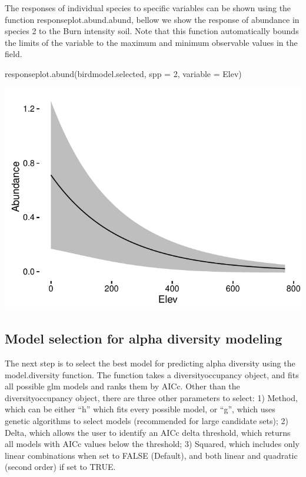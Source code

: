 \documentclass[article]{jss}
\begin{document}
The responses of individual species to specific variables can be shown
using the function responseplot.abund.abund, bellow we show the response
of abundance in species 2 to the Burn intensity soil. Note that this
function automatically bounds the limits of the variable to the maximum
and minimum observable values in the field.

\begin{CodeChunk}
\begin{CodeInput}
responseplot.abund(birdmodel.selected, spp = 2, variable = Elev)
\end{CodeInput}


\begin{center}\includegraphics{diversityocc_files/figure-latex/unnamed-chunk-16-1} \end{center}

\end{CodeChunk}

\subsection{Model selection for alpha diversity
modeling}\label{model-selection-for-alpha-diversity-modeling}

The next step is to select the best model for predicting alpha diversity
using the model.diversity function. The function takes a
diversityoccupancy object, and fits all possible glm models and ranks
them by AICc. Other than the diversityoccupancy object, there are three
other parameters to select: 1) Method, which can be either ``h'' which
fits every possible model, or ``g'', which uses genetic algorithms to
select models (recommended for large candidate sets); 2) Delta, which
allows the user to identify an AICc delta threshold, which returns all
models with AICc values below the threshold; 3) Squared, which includes
only linear combinations when set to FALSE (Default), and both linear
and quadratic (second order) if set to TRUE.
\end{document}

